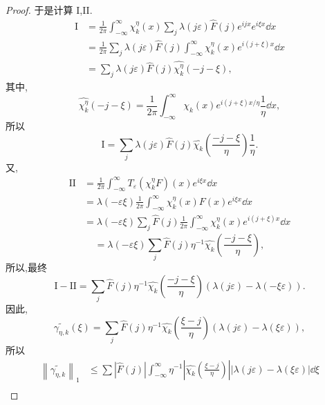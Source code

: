 \begin{proof}
于是计算 I,II.
\begin{align*}
\mathrm{I} &= \frac{1}{2\pi}\int_{-\infty}^{\infty}\chi_k^\eta(x)\sum_j\lambda(j\varepsilon)\widehat{F}(j)e^{ijx}e^{i\xi x}\dd x\\
&= \frac{1}{2\pi}\sum_j\lambda(j\varepsilon)\widehat{F}(j)\int_{-\infty}^{\infty}\chi_k^\eta(x)e^{i(j+\xi)x}\dd x\\
&= \sum_j\lambda(j\varepsilon)\widehat{F}(j)\widehat{\chi_k^\eta}(-j-\xi),
\end{align*}
其中,
\begin{equation*}
\widehat{\chi_k^\eta}(-j-\xi) = \frac{1}{2\pi}\int_{-\infty}^{\infty}\chi_k(x)e^{i(j+\xi)x/\eta}\frac{1}{\eta}\dd x,
\end{equation*}
所以
\begin{equation*}
\mathrm{I} = \sum_j\lambda(j\varepsilon)\widehat{F}(j)\widehat{\chi_k}\left(\frac{-j-\xi}{\eta}\right)\frac{1}{\eta}.
\end{equation*}
又,
\begin{align*}
\mathrm{II} &= \frac{1}{2\pi}\int_{-\infty}^{\infty}T_{\varepsilon}(\chi_k^\eta F)(x)e^{i\xi x}\dd x\\
&= \lambda(-\varepsilon\xi)\frac{1}{2\pi}\int_{-\infty}^{\infty}\chi_k^\eta(x)F(x)e^{i\xi x}\dd x\\
&= \lambda(-\varepsilon\xi)\sum_j\widehat{F}(j)\frac{1}{2\pi}\int_{-\infty}^{\infty}\chi_k^\eta(x)e^{i(j+\xi)x}\dd x
\end{align*}
\begin{equation*}
= \lambda(-\varepsilon\xi)\sum_j\widehat{F}(j)\eta^{-1}\widehat{\chi_k}\left(\frac{-j-\xi}{\eta}\right),
\end{equation*}
所以,最终
\begin{equation*}
\mathrm{I} - \mathrm{II} = \sum_j\widehat{F}(j)\eta^{-1}\widehat{\chi_k}\left(\frac{-j-\xi}{\eta}\right)(\lambda(j\varepsilon) - \lambda(-\xi\varepsilon)).
\end{equation*}
因此,
\begin{equation*}
\widetilde{\gamma_{\eta,k}}(\xi) = \sum_j\widehat{F}(j)\eta^{-1}\widehat{\chi_k}\left(\frac{\xi - j}{\eta}\right)(\lambda(j\varepsilon) - \lambda(\xi\varepsilon)),
\end{equation*}
所以
\begin{align*}
\left\|\widetilde{\gamma_{\eta,k}}\right\|_{1} &\leq \sum\left|\widehat{F}(j)\right|\int_{-\infty}^{\infty}\eta^{-1}\left|\widehat{\chi_k}\left(\frac{\xi - j}{\eta}\right)\right||\lambda(j\varepsilon) - \lambda(\xi\varepsilon)|\dd\xi\\

\end{align*}
\end{proof}
